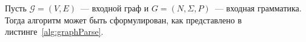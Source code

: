 Пусть $\mathcal{G} = (V, E)$~--- входной граф и $G = (N,\Sigma,P)$~--- входная грамматика. Тогда алгоритм может быть сформулирован, как представлено в листинге~\ref{alg:graphParse}.

\begin{algorithm}[H]


\end{algorithm}


